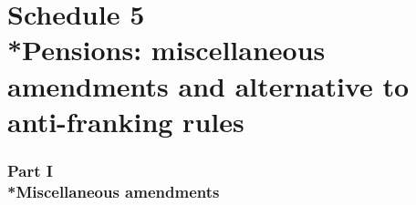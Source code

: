 \documentclass[12pt,a4paper]{article}
\begin{document}

\part[Schedule 5 --- Pensions: miscellaneous amendments and alternative to anti-franking rules]{Schedule 5\\*Pensions: miscellaneous amendments and alternative to anti-franking rules}

\section[Part I --- Miscellaneous amendments]{Part I\\*Miscellaneous amendments}

\renewcommand\parthead{--- Schedule 5 Part I}
\end{document}
